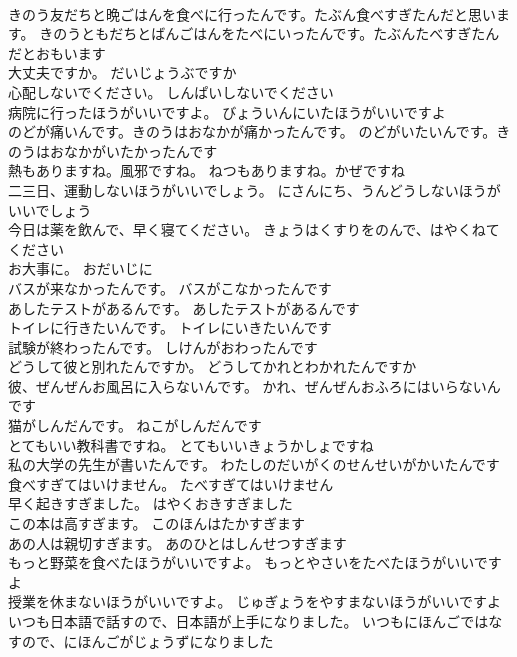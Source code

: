 \documentclass[8pt]{extreport}
\begin{document}
\begin{CJK}{UTF8}{min}
\\	きのう友だちと晩ごはんを食べに行ったんです。たぶん食べすぎたんだと思います。	きのうともだちとばんごはんをたべにいったんです。たぶんたべすぎたんだとおもいます 
\\	大丈夫ですか。	だいじょうぶですか 
\\	心配しないでください。	しんぱいしないでください 
\\	病院に行ったほうがいいですよ。	びょういんにいたほうがいいですよ 
\\	のどが痛いんです。きのうはおなかが痛かったんです。	のどがいたいんです。きのうはおなかがいたかったんです 
\\	熱もありますね。風邪ですね。	ねつもありますね。かぜですね 
\\	二三日、運動しないほうがいいでしょう。	にさんにち、うんどうしないほうがいいでしょう 
\\	今日は薬を飲んで、早く寝てください。	きょうはくすりをのんで、はやくねてください 
\\	お大事に。	おだいじに 
\\	バスが来なかったんです。	バスがこなかったんです 
\\	あしたテストがあるんです。	あしたテストがあるんです 
\\	トイレに行きたいんです。	トイレにいきたいんです 
\\	試験が終わったんです。	しけんがおわったんです 
\\	どうして彼と別れたんですか。	どうしてかれとわかれたんですか 
\\	彼、ぜんぜんお風呂に入らないんです。	かれ、ぜんぜんおふろにはいらないんです 
\\	猫がしんだんです。	ねこがしんだんです 
\\	とてもいい教科書ですね。	とてもいいきょうかしょですね 
\\	私の大学の先生が書いたんです。	わたしのだいがくのせんせいがかいたんです 
\\	食べすぎてはいけません。	たべすぎてはいけません 
\\	早く起きすぎました。	はやくおきすぎました 
\\	この本は高すぎます。	このほんはたかすぎます 
\\	あの人は親切すぎます。	あのひとはしんせつすぎます 
\\	もっと野菜を食べたほうがいいですよ。	もっとやさいをたべたほうがいいですよ 
\\	授業を休まないほうがいいですよ。	じゅぎょうをやすまないほうがいいですよ 
\\	いつも日本語で話すので、日本語が上手になりました。	いつもにほんごではなすので、にほんごがじょうずになりました 

\end{CJK}
\end{document}
